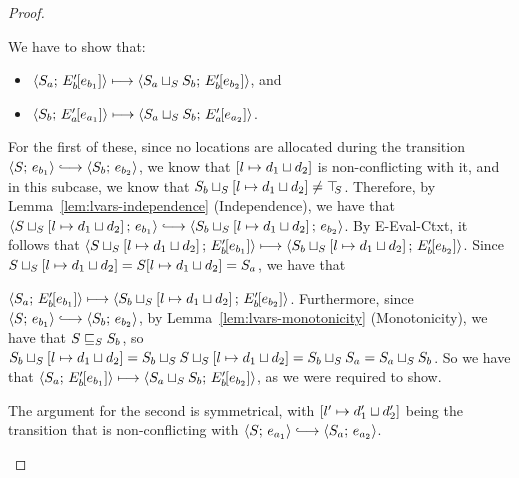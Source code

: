 \begin{proof}
\begin{enumerate}
\begin{enumerate}
\begin{itemize}
        We have to show that:
        \begin{itemize}
        \item $\langle S_a;\, E'_b\hspace{-1mm}\left[e_{b_1}\right] \rangle \longmapsto
          \langle S_a \sqcup_{S} S_b;\, E'_b\hspace{-1mm}\left[e_{b_2}\right] \rangle$, and
        \item $\langle S_b;\, E'_a\hspace{-1mm}\left[e_{a_1}\right] \rangle \longmapsto
          \langle S_a \sqcup_{S} S_b;\, E'_a\hspace{-1mm}\left[e_{a_2}\right] \rangle$.
        \end{itemize}

        For the first of these, since no locations are allocated
        during the transition $\config{S}{e_{b_1}} \parstepsto
        \config{S_b}{e_{b_2}}$, we know that
        $\left[ l \mapsto d_1 \sqcup d_2 \right]$ is
        non-conflicting with it, and in this subcase, we know that
        $S_b \sqcup_{S} \left[ l \mapsto d_1 \sqcup d_2 \right]
        \neq \top\hspace{-0.85mm}_{S}$.  Therefore, by Lemma~\ref{lem:lvars-independence}
        (Independence), we have that
        $\config{\lubstore{S}{\store{\storebindingRaw{l}{\userlub{d_1}{d_2}}}}}{e_{b_1}}
        \parstepsto
        \config{\lubstore{S_b}{\store{\storebindingRaw{l}{\userlub{d_1}{d_2}}}}}{e_{b_2}}$.
        By {\sc E-Eval-Ctxt}, it follows that
        $\langle S \sqcup_{S} \left[ l \mapsto d_1 \sqcup d_2 \right];\, E'_b\hspace{-1mm}\left[e_{b_1}\right] \rangle
        \longmapsto
        \langle S_b \sqcup_{S} \left[ l \mapsto d_1 \sqcup d_2 \right];\, E'_b\hspace{-1mm}\left[e_{b_2}\right] \rangle$.
        Since
        $S \sqcup_{S} \left[ l \mapsto d_1 \sqcup d_2 \right]
        = S[l \mapsto d_1 \sqcup d_2] = S_a$, we have that

        $\langle S_a;\, E'_b\hspace{-1mm}\left[e_{b_1}\right] \rangle \longmapsto
        \langle S_b \sqcup_{S} \left[ l \mapsto d_1 \sqcup d_2 \right];\, E'_b\hspace{-1mm}\left[e_{b_2}\right] \rangle$.
        Furthermore, since $\config{S}{e_{b_1}} \parstepsto
        \config{S_b}{e_{b_2}}$, by Lemma~\ref{lem:lvars-monotonicity}
        (Monotonicity), we have that $S \sqsubseteq_S S_b$, so
        $S_b \sqcup_{S} \left[ l \mapsto d_1 \sqcup d_2 \right]
        =
        S_b \sqcup_{S} S \sqcup_{S} \left[ l \mapsto d_1 \sqcup d_2 \right]
        = S_b \sqcup_{S} S_a = S_a \sqcup_{S} S_b$.  So we have that
        $\langle S_a;\, E'_b\hspace{-1mm}\left[e_{b_1}\right] \rangle \longmapsto
        \langle S_a \sqcup_{S} S_b;\, E'_b\hspace{-1mm}\left[e_{b_2}\right] \rangle$, as we
        were required to show.

        The argument for the second is symmetrical, with
        $\left[ l' \mapsto d'_1 \sqcup d'_2 \right]$ being the
        transition that is non-conflicting with $\config{S}{e_{a_1}}
        \parstepsto \config{S_a}{e_{a_2}}$.


\end{itemize}
\end{enumerate}
\end{enumerate}
\end{proof}
